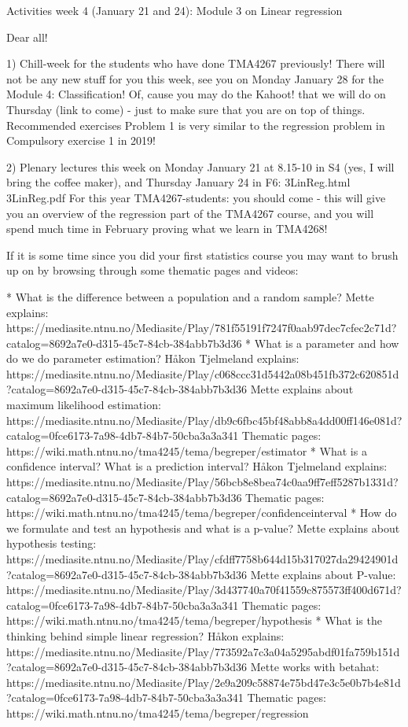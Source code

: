 
Activities week 4 (January 21 and 24): Module 3 on Linear regression

Dear all!

1) Chill-week for the students who have done TMA4267 previously! There will not be any new stuff for you this week, see you on Monday January 28 for the Module 4: Classification! Of, cause you may do the Kahoot! that we will do on Thursday (link to come) - just to make sure that you are on top of things. Recommended exercises Problem 1 is very similar to the regression problem in Compulsory exercise 1 in 2019!

2) Plenary lectures this week on Monday January 21 at 8.15-10 in S4 (yes, I will bring the coffee maker), and Thursday January 24 in F6:
3LinReg.html 3LinReg.pdf
For this year TMA4267-students: you should come - this will give you an overview of the regression part of the TMA4267 course, and you will spend much time in February proving what we learn in TMA4268!

If it is some time since you did your first statistics course you may want to brush up on by browsing through some thematic pages and videos:

* What is the difference between a population and a random sample? 
Mette explains: https://mediasite.ntnu.no/Mediasite/Play/781f55191f7247f0aab97dec7cfec2c71d?catalog=8692a7e0-d315-45c7-84cb-384abb7b3d36
* What is a parameter and how do we do parameter estimation?
Håkon Tjelmeland explains: https://mediasite.ntnu.no/Mediasite/Play/c068ccc31d5442a08b451fb372c620851d?catalog=8692a7e0-d315-45c7-84cb-384abb7b3d36
Mette explains about maximum likelihood estimation:
https://mediasite.ntnu.no/Mediasite/Play/db9c6fbc45bf48abb8a4dd00ff146e081d?catalog=0fce6173-7a98-4db7-84b7-50cba3a3a341
Thematic pages: https://wiki.math.ntnu.no/tma4245/tema/begreper/estimator
* What is a confidence interval? What is a prediction interval?
Håkon Tjelmeland explains: https://mediasite.ntnu.no/Mediasite/Play/56bcb8e8bea74c0aa9ff7eff5287b1331d?catalog=8692a7e0-d315-45c7-84cb-384abb7b3d36
Thematic pages: https://wiki.math.ntnu.no/tma4245/tema/begreper/confidenceinterval
* How do we formulate and test an hypothesis and what is a p-value?
Mette explains about hypothesis testing: https://mediasite.ntnu.no/Mediasite/Play/cfdff7758b644d15b317027da29424901d?catalog=8692a7e0-d315-45c7-84cb-384abb7b3d36
Mette explains about P-value: https://mediasite.ntnu.no/Mediasite/Play/3d437740a70f41559c875573ff400d671d?catalog=0fce6173-7a98-4db7-84b7-50cba3a3a341
Thematic pages: https://wiki.math.ntnu.no/tma4245/tema/begreper/hypothesis
* What is the thinking behind simple linear regression?
Håkon explains: https://mediasite.ntnu.no/Mediasite/Play/773592a7c3a04a5295abdf01fa759b151d?catalog=8692a7e0-d315-45c7-84cb-384abb7b3d36
Mette works with betahat: https://mediasite.ntnu.no/Mediasite/Play/2e9a209c58874e75bd47e3c5e0b7b4e81d?catalog=0fce6173-7a98-4db7-84b7-50cba3a3a341
Thematic pages: https://wiki.math.ntnu.no/tma4245/tema/begreper/regression

